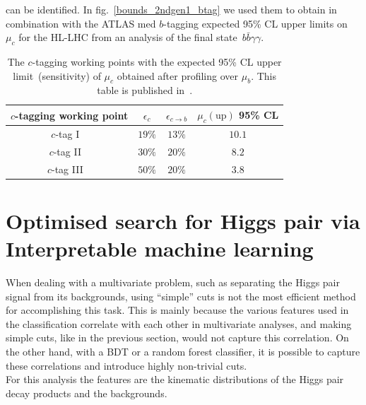 can be identified. In fig.~\ref{bounds_2ndgen1_btag}  we used them to obtain in combination with the ATLAS med $b$-tagging expected 95\% CL upper limits on~$\mu_c$ for the HL-LHC from an analysis of the final state~$b\bar{b}\gamma\gamma$.
\begin{table}
	\centering
	\begin{tabular}{cccc}
		\toprule
		$c$-tagging working point	&$\epsilon_{c}$	& $\epsilon_{c \to b}$ & $\mu_c(\mathrm{up})$ 95\% CL  \\
		\midrule
		$c$-tag I ~\cite{Aad:2015gna,ATLAS-CONF-2013-063}
		& $19\%$ & $13 \%$ & $ 10.1$\\
		$c$-tag II ~\cite{Capeans:1291633,ATL-PHYS-PUB-2015-018}
		& $30\%$ & $20 \%$ & $ 8.2$\\
		$c$-tag III ~\cite{Capeans:1291633,ATL-PHYS-PUB-2015-018}
		& $50\%$ & $20 \%$ & $ 3.8$\\
		\bottomrule
	\end{tabular}
	\caption{The $c$-tagging working points with the expected 95\% CL upper limit~(sensitivity) of $\mu_c$ obtained after profiling over $\mu_b$. This table is published in~\cite{Alasfar:2019pmn}. }
	\label{ctag_wp}
\end{table}
%
%
\section{Optimised search for Higgs pair via Interpretable machine learning \label{sec:mlanalysisly}}
When dealing with a multivariate problem, such as separating the Higgs pair signal from its backgrounds, using ``simple'' cuts is not the most efficient method for accomplishing this task. This is mainly because the various features used in the classification correlate with each other in multivariate analyses, and making simple cuts, like in the previous section, would not capture this correlation.  On the other hand,  with a BDT or a random forest classifier, it is possible to capture these correlations and introduce highly non-trivial cuts. \\ For this analysis the features are the kinematic distributions of the Higgs pair decay products and the backgrounds.
